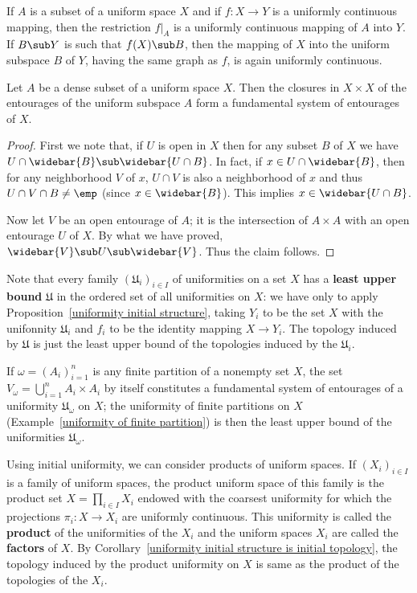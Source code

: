 If $A$ is a subset of a uniform space $X$ and if $f:X\to Y$ is a uniformly continuous mapping, then the restriction $f|_A$ is a uniformly continuous mapping of $A$ into $Y$. If $B\sub Y$ is such that $f(X)\sub B$, then the mapping of $X$ into the uniform subspace $B$ of $Y$, having the same graph as $f$, is again uniformly continuous.
\begin{proposition}\label{uniformity by dense subset}
Let $A$ be a dense subset of a uniform space $X$. Then the closures in $X\times X$ of the entourages of the uniform subspace $A$ form a fundamental system of entourages of $X$.
\end{proposition}
\begin{proof}
First we note that, if $U$ is open in $X$ then for any subset $B$ of $X$ we have $U\cap\widebar{B}\sub\widebar{U\cap B}$. In fact, if $x\in U\cap\widebar{B}$, then for any neighborhood $V$ of $x$, $U\cap V$ is also a neighborhood of $x$ and thus $U\cap V\cap B\neq\emp$ (since $x\in\widebar{B}$). This implies $x\in\widebar{U\cap B}$.\par
Now let $V$ be an open entourage of $A$; it is the intersection of $A\times A$ with an open entourage $U$ of $X$. By what we have proved, $\widebar{V}\sub U\sub\widebar{V}$. Thus the claim follows.
\end{proof}
Note that every family $(\mathfrak{U}_i)_{i\in I}$ of uniformities on a set $X$ has a \textbf{least upper bound} $\mathfrak{U}$ in the ordered set of all uniformities on $X$: we have only to apply Proposition~\ref{uniformity initial structure}, taking $Y_i$ to be the set $X$ with the unifonnity $\mathfrak{U}_i$ and $f_i$ to be the identity mapping $X\to Y_i$. The topology induced by $\mathfrak{U}$ is just the least upper bound of the topologies induced by the $\mathfrak{U}_i$.
\begin{example}
If $\omega=(A_i)_{i=1}^{n}$ is any finite partition of a nonempty set $X$, the set $V_\omega=\bigcup_{i=1}^{n}A_i\times A_i$ by itself constitutes a fundamental system of entourages of a uniformity $\mathfrak{U}_\omega$ on $X$; the uniformity of finite partitions on $X$ (Example~\ref{uniformity of finite partition}) is then the least upper bound of the uniformities $\mathfrak{U}_\omega$.
\end{example}
Using initial uniformity, we can consider products of uniform spaces. If $(X_i)_{i\in I}$ is a family of uniform spaces, the product uniform space of this family is the product set $X=\prod_{i\in I}X_i$ endowed with the coarsest uniformity for which the projections $\pi_i:X\to X_i$ are uniformly continuous. This uniformity is called the \textbf{product} of the uniformities of the $X_i$ and the uniform spaces $X_i$ are called the \textbf{factors} of $X$. By Corollary~\ref{uniformity initial structure is initial topology}, the topology induced by the product uniformity on $X$ is same as the product of the topologies of the $X_i$.
